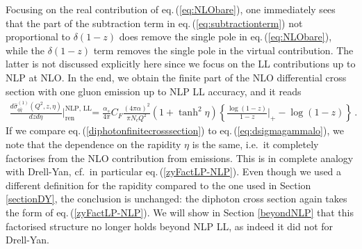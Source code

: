 \documentclass[11pt]{article}
\newcommand\eqn[1]     {eq.\,(\ref{#1})}
\begin{document}
Focusing on the real contribution of \eqn{eq:NLObare}, 
one immediately sees that the part of the subtraction 
term in \eqn{eq:subtractionterm} not proportional to 
$\delta(1-z)$ does remove the single pole in 
\eqn{eq:NLObare}, while the $\delta(1-z)$ term  
removes the single pole in the virtual 
contribution. The latter is not discussed explicitly here
since we focus on the LL contributions up to NLP 
at NLO. In the end, we obtain the finite part of 
the NLO differential cross section with one 
gluon emission up to NLP LL accuracy, and it reads
%
\begin{align}
    \frac{d\hat{\sigma}_{q\bar{q}}^{(1)}(Q^2,z,\eta)}{dzd\eta}\bigg|_{\text{ren}}^{\text{NLP, LL}}
     &= \frac{\alpha_s}{4\pi}C_F\frac{(4\pi\alpha)^2}{\pi N_c Q^2} \left(1+\tanh^2\eta\right)\left\{\frac{\log(1-z)}{1-z}\bigg|_+ - \log(1-z)\right\}\,.\label{diphotonfinitecrosssection}
\end{align}
%
If we compare \eqn{diphotonfinitecrosssection} to \eqn{eq:dsigmagammalo}, we note that the dependence on the rapidity $\eta$ is the same, i.e.\ it completely factorises from the NLO contribution from emissions. This is in complete analogy with Drell-Yan, cf.\ in particular \eqn{zyFactLP-NLP}. Even though we used a different definition for the rapidity compared to the one used in Section \ref{sectionDY}, the conclusion is unchanged: the diphoton cross section again takes the form of \eqn{zyFactLP-NLP}. We will show in Section \ref{beyondNLP} that this factorised structure no longer holds beyond NLP LL, as indeed it did not for Drell-Yan.
\end{document}
